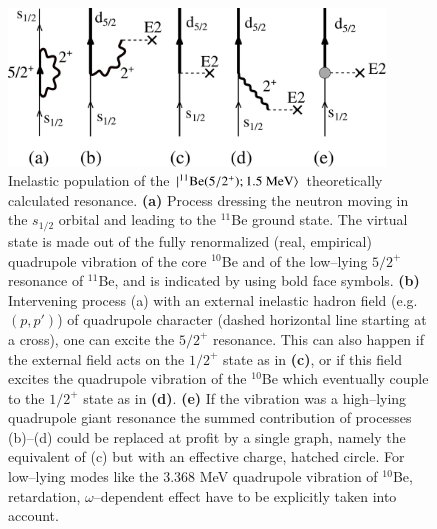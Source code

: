   \begin{figure}
  \centerline{\includegraphics*[width=10cm,angle=0]{C8/figsC8/fig6_6_1}}
  	\caption{Inelastic population of the $|{^{11}\text{Be}(5/2^+); 1.5\text{ MeV}} \rangle$ theoretically calculated resonance. \textbf{(a)} Process dressing the neutron moving in the $s_{1/2}$ orbital and leading to the $^{11}$Be ground state. The virtual state is made out of the fully renormalized (real, empirical) quadrupole vibration of the core $^{10}$Be and of the low--lying $5/2^+$ resonance of $^{11}$Be, and is indicated by using bold face symbols. \textbf{(b)} Intervening process (a) with an external inelastic hadron field (e.g. $(p,p')$) of quadrupole character (dashed horizontal line starting at a cross), one can excite the $5/2^+$ resonance. This can also happen if the external field acts on the $1/2^+$ state as in \textbf{(c)}, or if this field excites the quadrupole vibration of the $^{10}$Be which eventually couple to the $1/2^+$ state as in \textbf{(d)}. \textbf{(e)} If the vibration was a high--lying quadrupole giant resonance the summed contribution of processes {(b)}--{(d)} could be replaced at profit by a single graph, namely the equivalent of (c) but with an effective charge, hatched circle. For low--lying modes like the 3.368 MeV quadrupole vibration of $^{10}$Be, retardation, $\omega$--dependent effect have to be explicitly taken into account.}\label{fig6.6.1}
  \end{figure}

